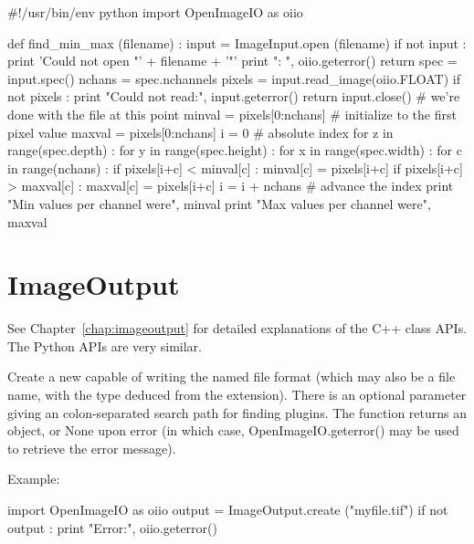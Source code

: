 \begin{code}
#!/usr/bin/env python 
import OpenImageIO as oiio

def find_min_max (filename) :
    input = ImageInput.open (filename)
    if not input :
        print 'Could not open "' + filename + '"'
        print "\tError: ", oiio.geterror()
        return
    spec = input.spec()
    nchans = spec.nchannels
    pixels = input.read_image(oiio.FLOAT)
    if not pixels :
        print "Could not read:", input.geterror()
        return
    input.close()    # we're done with the file at this point
    minval = pixels[0:nchans]   # initialize to the first pixel value
    maxval = pixels[0:nchans]
    i = 0    # absolute index
    for z in range(spec.depth) :
        for y in range(spec.height) :
            for x in range(spec.width) :
                for c in range(nchans) :
                    if pixels[i+c] < minval[c] :
                        minval[c] = pixels[i+c]
                    if pixels[i+c] > maxval[c] :
                        maxval[c] = pixels[i+c]
                i = i + nchans   # advance the index
    print "Min values per channel were", minval
    print "Max values per channel were", maxval
\end{code}
\newpage


\section{ImageOutput}
\label{sec:pythonimageoutput}

See Chapter~\ref{chap:imageoutput} for detailed explanations of the
C++ \ImageOutput class APIs. The Python APIs are very similar.


Create a new \ImageOutput capable of writing the named file format (which may
also be a file name, with the type deduced from the extension).  There
is an optional parameter giving an colon-separated search path for finding
\ImageOutput plugins.  The function returns an \ImageOutput object, or
{\cf None} upon error (in which case, {OpenImageIO.geterror()} may be used
to retrieve the error message).

\noindent Example:
\begin{code}
    import OpenImageIO as oiio
    output = ImageOutput.create ("myfile.tif")
    if not output :
        print "Error:", oiio.geterror()
\end{code}
\apiend

